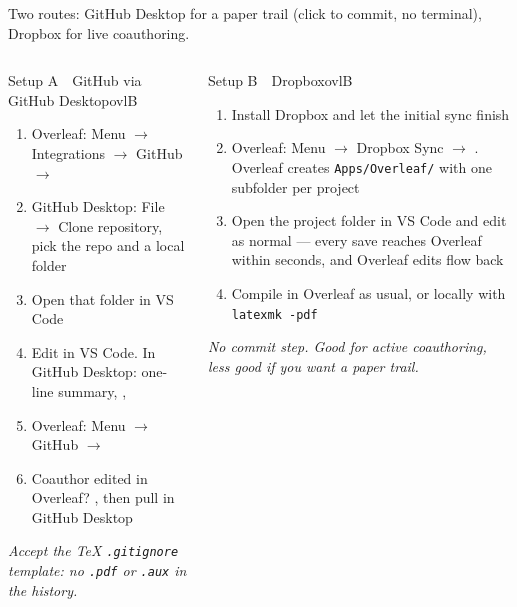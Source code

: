 \documentclass[aspectratio=169, 10pt]{beamer}
\begin{document}
\begin{frame}{Two routes: GitHub Desktop for a paper trail (click to commit, no terminal), Dropbox for live coauthoring.}
\begin{columns}[t]
\begin{mckcardg}[mcknavy]{Setup A\ \ GitHub via GitHub Desktop}{ovlB}
\scriptsize
\begin{enumerate}\setlength{\itemsep}{0pt}
  \item Overleaf: Menu $\to$ Integrations $\to$ GitHub $\to$ 
  \item GitHub Desktop: File $\to$ Clone repository, pick the repo and a local folder
  \item Open that folder in VS Code
  \item Edit in VS Code. In GitHub Desktop: one-line summary, , 
  \item Overleaf: Menu $\to$ GitHub $\to$ 
  \item Coauthor edited in Overleaf? , then pull in GitHub Desktop
\end{enumerate}
\textit{Accept the TeX \texttt{.gitignore} template: no \texttt{.pdf} or \texttt{.aux} in the history.}
\end{mckcardg}

\begin{mckcardg}[mckteal]{Setup B\ \ Dropbox}{ovlB}
\scriptsize
\begin{enumerate}\setlength{\itemsep}{0pt}
  \item Install Dropbox and let the initial sync finish
  \item Overleaf: Menu $\to$ Dropbox Sync $\to$ . Overleaf creates \texttt{Apps/Overleaf/} with one subfolder per project
  \item Open the project folder in VS Code and edit as normal --- every save reaches Overleaf within seconds, and Overleaf edits flow back
  \item Compile in Overleaf as usual, or locally with \texttt{latexmk -pdf}
\end{enumerate}
\textit{No commit step. Good for active coauthoring, less good if you want a paper trail.}
\end{mckcardg}
\end{columns}
\end{frame}
\end{document}
